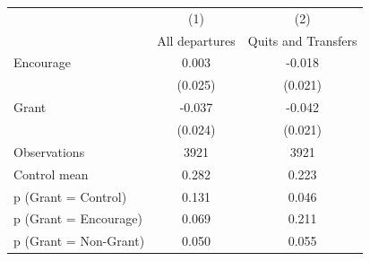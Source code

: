 \begin{tabular*}{\hsize}{@{\hskip\tabcolsep\extracolsep\fill}l*{2}{c}}
\toprule
                    &\multicolumn{1}{c}{(1)}&\multicolumn{1}{c}{(2)}\\
                    &\multicolumn{1}{c}{All departures}&\multicolumn{1}{c}{Quits and Transfers}\\
\midrule
Encourage           &       0.003&      -0.018\\
                    &     (0.025)&     (0.021)\\
\addlinespace
Grant               &      -0.037&      -0.042\\
                    &     (0.024)&     (0.021)\\
\midrule
Observations        &        3921&        3921\\
Control mean        &       0.282&       0.223\\
p (Grant = Control) &       0.131&       0.046\\
p (Grant = Encourage)&       0.069&       0.211\\
p (Grant = Non-Grant)&       0.050&       0.055\\
\bottomrule
\end{tabular*}

